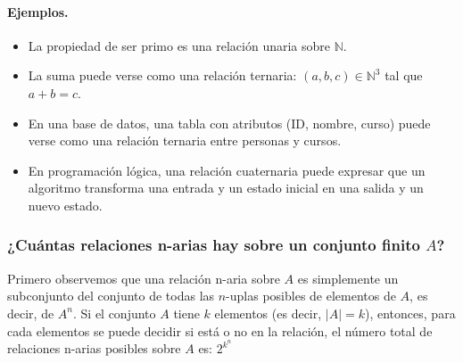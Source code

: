 \paragraph{Ejemplos.}
\begin{itemize}
  \item La propiedad de ser primo es una relación unaria sobre $\mathbb{N}$.
  \item La suma puede verse como una relación ternaria: $(a,b,c) \in \mathbb{N}^3$ tal que $a + b = c$.
  \item En una base de datos, una tabla con atributos (ID, nombre, curso) puede verse como una relación ternaria entre personas y cursos.
  \item En programación lógica, una relación cuaternaria puede expresar que un algoritmo transforma una entrada y un estado inicial en una salida y un nuevo estado.
\end{itemize}

\subsubsection*{¿Cuántas relaciones n-arias hay sobre un conjunto finito $A$?}
Primero observemos que una relación n-aria sobre $A$ es simplemente un subconjunto del conjunto de todas las $n$-uplas posibles de elementos de $A$, es decir, de $A^n$.
Si el conjunto $A$ tiene $k$ elementos (es decir, $|A| = k$), entonces, para cada elementos se puede decidir si está o no en la relación, el número total de relaciones n-arias posibles sobre $A$ es: $2^{k^n}$
